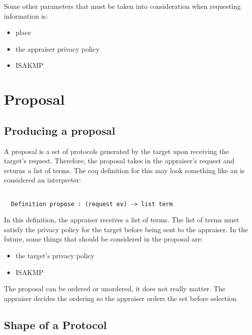 \documentclass[10pt]{report}
\newcommand{\squash}{\itemsep=0pt\parskip=0pt}
\begin{document}
  
  Some other parameters that must be taken into consideration when
  requesting information is: 
  
  \begin{itemize}
   \squash
   \item place
   \item the appraiser privacy policy
   \item ISAKMP
  \end{itemize}

\section{Proposal}

\subsection{Producing a proposal}

A proposal is a set of protocols generated by the target upon receiving
the target's request. Therefore, the proposal takes in the appraiser's
request and returns a list of terms. The coq definition for this may
look something like an is considered an interpreter: 
  
\begin{verbatim}
  
  Definition propose : (request ev) -> list term

\end{verbatim}  
  
  In this definition, the appraiser receives a list of terms. The list
  of terms must satisfy the privacy policy for the target before being
  sent to the appraiser. In the future, some things that should be
  considered in the proposal are:
  
  \begin{itemize}
   \squash
   \item the target's privacy policy
   \item ISAKMP
  \end{itemize}
  
  The proposal can be ordered or unordered, it does not really
  matter. The appraiser decides the ordering so the appraiser orders
  the set before selection.

\subsection{Shape of a Protocol}
\end{document}
